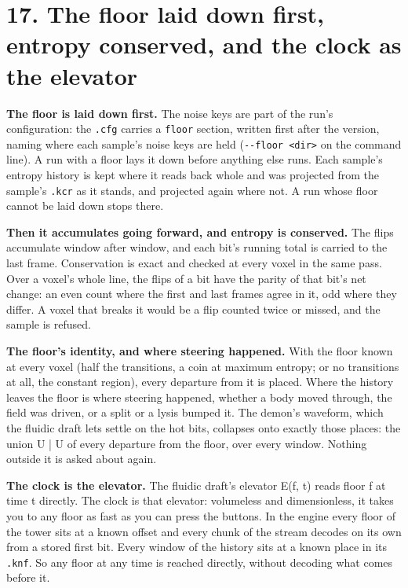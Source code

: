 \section{\texorpdfstring{17. The floor laid down first, entropy conserved, and the clock as the elevator}{17. The floor laid down first, entropy conserved, and the clock as the elevator}}

\textbf{The floor is laid down first.} The noise keys are part of the run's configuration: the \texttt{.\allowbreak{}cfg} carries a \texttt{floor} section, written first after the version, naming where each sample's noise keys are held (\texttt{-\allowbreak{}-\allowbreak{}floor <dir>} on the command line). A run with a floor lays it down before anything else runs. Each sample's entropy history is kept where it reads back whole and was projected from the sample's \texttt{.\allowbreak{}kcr} as it stands, and projected again where not. A run whose floor cannot be laid down stops there.

\textbf{Then it accumulates going forward, and entropy is conserved.} The flips accumulate window after window, and each bit's running total is carried to the last frame. Conservation is exact and checked at every voxel in the same pass. Over a voxel's whole line, the flips of a bit have the parity of that bit's net change: an even count where the first and last frames agree in it, odd where they differ. A voxel that breaks it would be a flip counted twice or missed, and the sample is refused.

\textbf{The floor's identity, and where steering happened.} With the floor known at every voxel (half the transitions, a coin at maximum entropy; or no transitions at all, the constant region), every departure from it is placed. Where the history leaves the floor is where steering happened, whether a body moved through, the field was driven, or a split or a lysis bumped it. The demon's waveform, which the fluidic draft lets settle on the hot bits, collapses onto exactly those places: the union U | U of every departure from the floor, over every window. Nothing outside it is asked about again.

\textbf{The clock is the elevator.} The fluidic draft's elevator E(f, t) reads floor f at time t directly. The clock is that elevator: volumeless and dimensionless, it takes you to any floor as fast as you can press the buttons. In the engine every floor of the tower sits at a known offset and every chunk of the stream decodes on its own from a stored first bit. Every window of the history sits at a known place in its \texttt{.\allowbreak{}knf}. So any floor at any time is reached directly, without decoding what comes before it.

